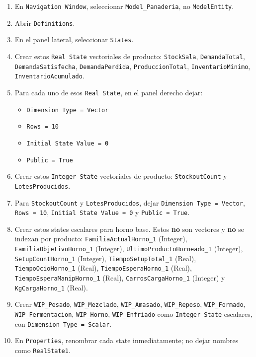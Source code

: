\documentclass[11pt]{article}
\newcommand{\simio}[1]{\texttt{#1}}
\newcommand{\state}[1]{\texttt{#1}}
\begin{document}
\begin{enumerate}
  \item En \simio{Navigation Window}, seleccionar \simio{Model\_Panaderia}, no \simio{ModelEntity}.
  \item Abrir \simio{Definitions}.
  \item En el panel lateral, seleccionar \simio{States}.
  \item Crear estos \simio{Real State} vectoriales de producto: \state{StockSala}, \state{DemandaTotal}, \state{DemandaSatisfecha}, \state{DemandaPerdida}, \state{ProduccionTotal}, \state{InventarioMinimo}, \state{InventarioAcumulado}.
  \item Para cada uno de esos \simio{Real State}, en el panel derecho dejar:
  \begin{itemize}
    \item \simio{Dimension Type = Vector}
    \item \simio{Rows = 10}
    \item \simio{Initial State Value = 0}
    \item \simio{Public = True}
  \end{itemize}
  \item Crear estos \simio{Integer State} vectoriales de producto: \state{StockoutCount} y \state{LotesProducidos}.
  \item Para \state{StockoutCount} y \state{LotesProducidos}, dejar \simio{Dimension Type = Vector}, \simio{Rows = 10}, \simio{Initial State Value = 0} y \simio{Public = True}.
  \item Crear estos states escalares para horno base. Estos \textbf{no} son vectores y \textbf{no} se indexan por producto: \state{FamiliaActualHorno\_1} (Integer), \state{FamiliaObjetivoHorno\_1} (Integer), \state{UltimoProductoHorneado\_1} (Integer), \state{SetupCountHorno\_1} (Integer), \state{TiempoSetupTotal\_1} (Real), \state{TiempoOcioHorno\_1} (Real), \state{TiempoEsperaHorno\_1} (Real), \state{TiempoEsperaManipHorno\_1} (Real), \state{CarrosCargaHorno\_1} (Integer) y \state{KgCargaHorno\_1} (Real).
  \item Crear \state{WIP\_Pesado}, \state{WIP\_Mezclado}, \state{WIP\_Amasado}, \state{WIP\_Reposo}, \state{WIP\_Formado}, \state{WIP\_Fermentacion}, \state{WIP\_Horno}, \state{WIP\_Enfriado} como \simio{Integer State} escalares, con \simio{Dimension Type = Scalar}.
  \item En \simio{Properties}, renombrar cada state inmediatamente; no dejar nombres como \simio{RealState1}.
\end{enumerate}
\end{document}
